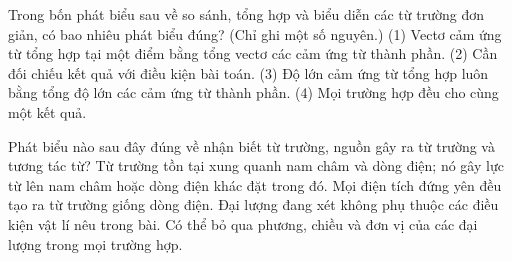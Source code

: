 \begin{ex}
Trong bốn phát biểu sau về so sánh, tổng hợp và biểu diễn các từ trường đơn giản, có bao nhiêu phát biểu đúng? (Chỉ ghi một số nguyên.) (1) Vectơ cảm ứng từ tổng hợp tại một điểm bằng tổng vectơ các cảm ứng từ thành phần. (2) Cần đối chiếu kết quả với điều kiện bài toán. (3) Độ lớn cảm ứng từ tổng hợp luôn bằng tổng độ lớn các cảm ứng từ thành phần. (4) Mọi trường hợp đều cho cùng một kết quả.
\end{ex}

\begin{ex}
Phát biểu nào sau đây đúng về nhận biết từ trường, nguồn gây ra từ trường và tương tác từ?
\choice
{\True Từ trường tồn tại xung quanh nam châm và dòng điện; nó gây lực từ lên nam châm hoặc dòng điện khác đặt trong đó.}
{Mọi điện tích đứng yên đều tạo ra từ trường giống dòng điện.}
{Đại lượng đang xét không phụ thuộc các điều kiện vật lí nêu trong bài.}
{Có thể bỏ qua phương, chiều và đơn vị của các đại lượng trong mọi trường hợp.}
\end{ex}

